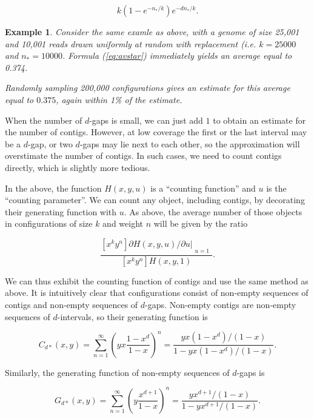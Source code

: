 \documentclass{article}
\newtheorem{example}{Example}
\begin{document}
\begin{equation}
\label{eq:avstar}
k(1-e^{-n_*/k})e^{-dn_*/k}.
\end{equation}

\begin{example}
Consider the same examle as above, with a genome of size 25,001 and 10,001
reads drawn uniformly at random with replacement (\textit{i.e.} $k =
25000$ and $n_* = 10000$. Formula (\ref{eq:avstar}) immediately yields an
average equal to 0.374.

Randomly sampling 200,000 configurations gives an estimate for this
average equal to $0.375$, again within 1\% of the estimate.
\end{example}

When the number of $d$-gaps is small, we can just add $1$ to obtain an
estimate for the number of contigs. However, at low coverage the first or
the last interval may be a $d$-gap, or two $d$-gaps may lie next to each
other, so the approximation will overstimate the number of contigs. In
such cases, we need to count contigs directly, which is slightly more
tedious.

In the above, the function $H(x,y,u)$ is a ``counting function'' and $u$
is the ``counting parameter''. We can count any object, including contigs,
by decorating their generating function with $u$. As above, the average
number of those objects in configurations of size $k$ and weight $n$ will
be given by the ratio

\begin{equation*}
\frac{[x^ky^n] \partial H(x,y,u)/\partial u|_{\substack{\\u=1}}}
{[x^ky^n]H(x,y,1)}.
\end{equation*}

We can thus exhibit the counting function of contigs and use the same
method as above. It is intuitively clear that configurations consist of
non-empty sequences of contigs and non-empty sequences of $d$-gaps.
Non-empty contigs are non-empty sequences of $d$-intervals, so their
generating function is

\begin{equation*}
C_{d*}(x,y) = \sum_{n=1}^\infty \left(yx\frac{1-x^d}{1-x} \right)^n
= \frac{yx(1-x^d)/(1-x)}{1-yx(1-x^d)/(1-x)}.
\end{equation*}

Similarly, the generating function of non-empty sequences of $d$-gaps is

\begin{equation*}
G_{d*}(x,y) = \sum_{n=1}^\infty \left(y\frac{x^{d+1}}{1-x} \right)^n
= \frac{yx^{d+1}/(1-x)}{1-yx^{d+1}/(1-x)}.
\end{equation*}
\end{document}
